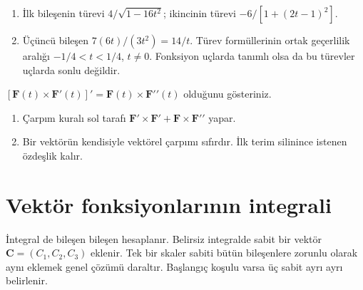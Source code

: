 \begin{tcolorbox}[title={Adım adım çözüm},colback=green!3!white,colframe=green]\begin{enumerate}
\item İlk bileşenin türevi \(4/\sqrt{1-16t^2}\); ikincinin türevi \(-6/[1+(2t-1)^2]\).
\item Üçüncü bileşen \(7(6t)/(3t^2)=14/t\). Türev formüllerinin ortak geçerlilik aralığı \(-1/4<t<1/4\), \(t\ne0\). Fonksiyon uçlarda tanımlı olsa da bu türevler uçlarda sonlu değildir.
\end{enumerate}\end{tcolorbox}
\begin{tcolorbox}[title={Örnek 3.9 | Tahtadaki özdeşliğin kanıtı},colframe=accent]\([\mathbf F(t)\times\mathbf F\prime(t)]\prime=\mathbf F(t)\times\mathbf F\prime\prime(t)\) olduğunu gösteriniz.
\par{}\end{tcolorbox}
\begin{tcolorbox}[title={Adım adım çözüm},colback=green!3!white,colframe=green]\begin{enumerate}
\item Çarpım kuralı sol tarafı \(\mathbf F\prime\times\mathbf F\prime+\mathbf F\times\mathbf F\prime\prime\) yapar.
\item Bir vektörün kendisiyle vektörel çarpımı sıfırdır. İlk terim silinince istenen özdeşlik kalır.
\end{enumerate}\end{tcolorbox}
\section{Vektör fonksiyonlarının integrali}
İntegral de bileşen bileşen hesaplanır. Belirsiz integralde sabit bir vektör \(\mathbf C=(C_1,C_2,C_3)\) eklenir. Tek bir skaler sabiti bütün bileşenlere zorunlu olarak aynı eklemek genel çözümü daraltır. Başlangıç koşulu varsa üç sabit ayrı ayrı belirlenir.


